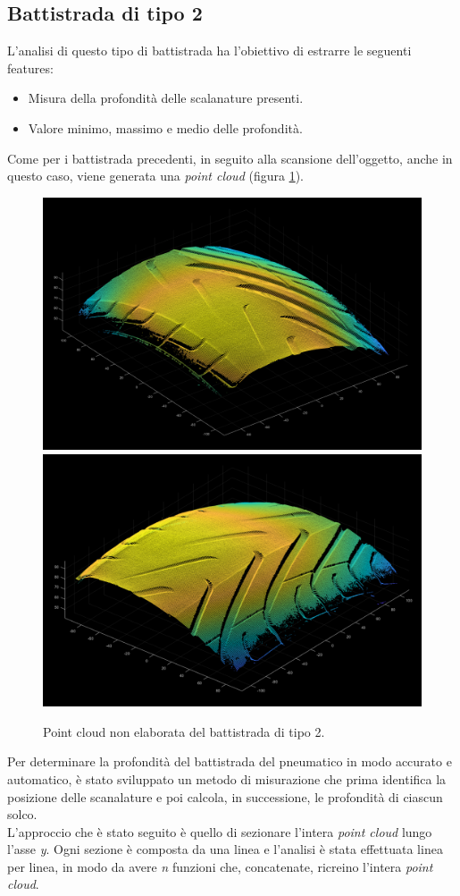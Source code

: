 \subsection{Battistrada di tipo 2}
L'analisi di questo tipo di battistrada ha l'obiettivo di estrarre le seguenti features:
\begin{itemize}
	\item Misura della profondità delle scalanature presenti.
	\item Valore minimo, massimo e medio delle profondità.
\end{itemize}

\noindent Come per i battistrada precedenti, in seguito alla scansione dell'oggetto, anche in questo caso, viene generata una \textit{point cloud} (figura \ref{fig:batt_2_analisi_1}).\\

\begin{figure}[H]
	\centering
	\includegraphics[width=0.45\columnwidth]{./pictures/batt_2_analisi_1.png}
	\includegraphics[width=0.45\columnwidth]{./pictures/batt_2_analisi_2.png}
	\caption{Point cloud non elaborata del battistrada di tipo 2.}\label{fig:batt_2_analisi_1}
\end{figure}

\noindent Per determinare la profondità del battistrada del pneumatico in modo accurato e automatico, è stato sviluppato un metodo di misurazione che prima identifica la posizione delle scanalature e poi calcola, in successione, le profondità di ciascun solco.\\
\newline
L'approccio che è stato seguito è quello di sezionare l'intera \textit{point cloud} lungo l'asse \textit{y}. Ogni sezione è composta da una linea e l'analisi è stata effettuata linea per linea, in modo da avere \textit{n} funzioni che, concatenate, ricreino l'intera \textit{point cloud}.\\

